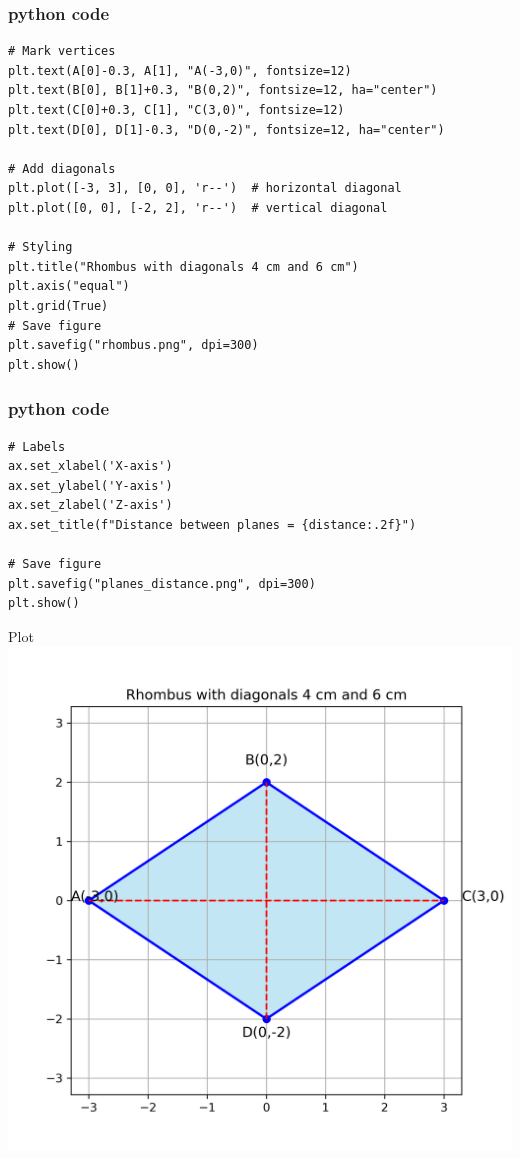 \documentclass{beamer}
\begin{document}
\begin{frame}[fragile]
    \frametitle{python code }
    \begin{lstlisting}
# Mark vertices
plt.text(A[0]-0.3, A[1], "A(-3,0)", fontsize=12)
plt.text(B[0], B[1]+0.3, "B(0,2)", fontsize=12, ha="center")
plt.text(C[0]+0.3, C[1], "C(3,0)", fontsize=12)
plt.text(D[0], D[1]-0.3, "D(0,-2)", fontsize=12, ha="center")

# Add diagonals
plt.plot([-3, 3], [0, 0], 'r--')  # horizontal diagonal
plt.plot([0, 0], [-2, 2], 'r--')  # vertical diagonal

# Styling
plt.title("Rhombus with diagonals 4 cm and 6 cm")
plt.axis("equal")
plt.grid(True)
# Save figure
plt.savefig("rhombus.png", dpi=300)
plt.show()

\end{lstlisting}
\end{frame}

\begin{frame}[fragile]
    \frametitle{python code }
    \begin{lstlisting}
# Labels
ax.set_xlabel('X-axis')
ax.set_ylabel('Y-axis')
ax.set_zlabel('Z-axis')
ax.set_title(f"Distance between planes = {distance:.2f}")

# Save figure
plt.savefig("planes_distance.png", dpi=300)
plt.show()

    \end{lstlisting}
\end{frame}
\begin{frame}{Plot}
    \centering
    \includegraphics[width=\columnwidth, height=0.8\textheight, keepaspectratio]{figs/rhombus.png}     
\end{frame}
\end{document}

